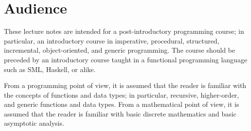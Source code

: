 \section*{Audience}

These lecture notes are intended for a post-introductory programming course; in
particular, an introductory course in imperative, procedural, structured,
incremental, object-oriented, and generic programming. The course should be
preceded by an introductory course taught in a functional programming language
such as SML, Haskell, or alike.

From a programming point of view, it is assumed that the reader is familiar
with the concepts of functions and data types; in particular, recursive,
higher-order, and generic functions and data types. From a mathematical point
of view, it is assumed that the reader is familiar with basic discrete
mathematics and basic asymptotic analysis.
